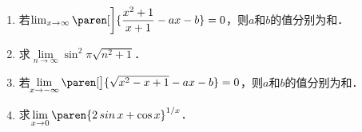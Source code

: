 \documentclass[a4paper,punct=CCT]{ctexbook}
\theoremstyle{definition}
\theoremstyle{remark}
\newif\ifshowsol
\begin{document}
\begin{enumerate}
\item 若\(\lim_{x\to\infty} \paren[\bigg]{\dfrac{x^2+1}{x+1} - ax -b} = 0\)，则\(a\)和\(b\)的值分别为\uline{\makebox[3em]{%
      \ifshowsol
      \(-1\)
      \fi}}和\uline{\makebox[3em]{%
      \ifshowsol
      \(1\)
      \fi}}．

\item 求\(\lim\limits_{n\to\infty} \sin^2 \pi\sqrt{n^2+1}\)．

  \ifshowsol
  稍作变形，有
  \begin{align*}
    \lim_{n \to \infty} \sin^2 \pi\sqrt{n^2+1}
    &= \lim_{n \to \infty} \sin^2 \brce[\big]{\paren[\big]{\sqrt{n^2+1} - \sqrt{n^2} + \sqrt{n^2}} \pi} \\
    &= \lim_{n \to \infty}
      \bigl\lbrace
      \sin\brkt[\big]{\paren[\big]{\sqrt{n^2+1} - \sqrt{n^2}}\pi}
      \cos\pi\sqrt{n^2} \\
    &\hphantom{= \lim_{n \to \infty} \lbrace} +
      \cos\brkt[\big]{\paren[\big]{\sqrt{n^2+1} - \sqrt{n^2}}\pi}
      \sin\pi\sqrt{n^2}
      \bigr\rbrace^2 \\
    &= \lim_{n \to \infty}
      \sin^2\brkt[\big]{\paren[\big]{\sqrt{n^2+1} - \sqrt{n^2}}\pi}
      \cos^2\pi\sqrt{n^2} \\
    &= \lim_{n \to \infty} \sin^2\brkt[\big]{\paren[\big]{\sqrt{n^2+1} - \sqrt{n^2}}\pi} \\
    &= 0.
  \end{align*}
  \fi

\item 若\(\!\lim\limits_{x\to-\infty} \paren[\big]{\sqrt{x^2 - x + 1} - ax - b} = 0\)，则\(a\)和\(b\)的值分别为\uline{\makebox[3em]{%
      \ifshowsol
      \(-1\)
      \fi}}和\uline{\makebox[3em]{%
      \ifshowsol
      \(1/2\)
      \fi}}．

\item 求\(\lim\limits_{x\to0} \paren{2 \sin x + \cos x}^{1/x}\)．

  \ifshowsol
  稍作变形，有
  \begin{align*}
    \lim_{x\to0} \paren{2 \sin x + \cos x}^{1/x}
    &= \lim_{x\to0} \expb[\bigg]{
      \frac{\lnp{1 + 2 \sin x + \cos x - 1}}{2 \sin x + \cos x - 1}
      \cdot
      \frac{2 \sin x + \cos x - 1}{x}} \\
    &= e^2.
  \end{align*}
  \fi


\end{enumerate}
\end{document}
